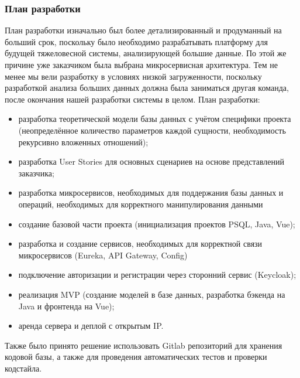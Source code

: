     \subsubsection{План разработки}
    План разработки изначально был более детализированный и продуманный на больший срок, поскольку было необходимо разрабатывать платформу для будущей тяжеловесной системы, анализирующей большие данные. По этой же причине уже заказчиком была выбрана микросервисная архитектура. Тем не менее мы вели разработку в условиях низкой загруженности, поскольку разработкой анализа больших данных должна была заниматься другая команда, после окончания нашей разработки системы в целом. План разработки:
    \begin{itemize}
        \item разработка теоретической модели базы данных с учётом специфики проекта (неопределённое количество параметров каждой сущности, необходимость рекурсивно вложенных отношений);
        \item разработка User Stories для основных сценариев на основе представлений заказчика;
        \item разработка микросервисов, необходимых для поддержания базы данных и операций, необходимых для корректного манипулирования данными
        \item создание базовой части проекта (инициализация проектов PSQL, Java, Vue);
        \item разработка и создание сервисов, необходимых для корректной связи микросервисов (Eureka, API Gateway, Config)
        \item подключение авторизации и регистрации через сторонний сервис (Keycloak);
        \item реализация MVP (создание моделей в базе данных, разработка бэкенда на Java и фронтенда на Vue);
        \item аренда сервера и деплой с открытым IP.
    \end{itemize}
    Также было принято решение использовать Gitlab репозиторий для хранения кодовой базы, а также для проведения автоматических тестов и проверки кодстайла.

